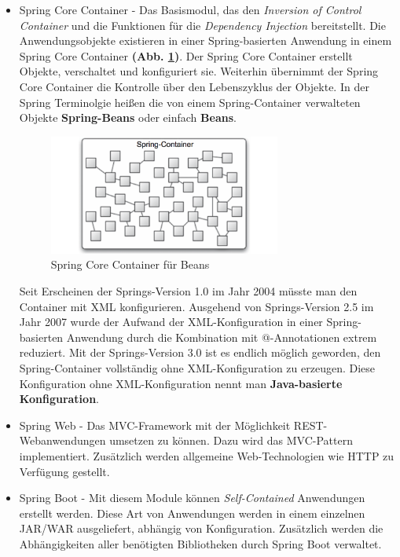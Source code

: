 \begin{itemize}
	\item Spring Core Container - Das Basismodul, das den \textit{Inversion of Control Container} \cite{InAndOutOfControl} und die Funktionen für die \textit{Dependency Injection} \cite{DIinSpring} bereitstellt. Die Anwendungsobjekte existieren in einer Spring-basierten Anwendung in einem Spring Core Container \textbf{(Abb. \ref{img:container})}. Der Spring Core Container erstellt Objekte, verschaltet und konfiguriert sie. Weiterhin übernimmt der Spring Core Container die Kontrolle über den Lebenszyklus der Objekte. In der Spring Terminolgie heißen die von einem Spring-Container verwalteten Objekte \textbf{Spring-Beans} oder einfach \textbf{Beans}.

\begin{figure}[H]
\centering
\includegraphics[width=3.0in]{resources/container}
\caption[Spring Core Container für Beans]{Spring Core Container für Beans}
\label{img:container}
\end{figure}

Seit Erscheinen der Springs-Version 1.0 im Jahr 2004 müsste man den Container mit XML konfigurieren. Ausgehend von Springs-Version 2.5 im Jahr 2007 wurde der Aufwand der XML-Konfiguration in einer Spring-basierten Anwendung durch die Kombination mit @-Annotationen extrem reduziert. Mit der Springs-Version 3.0 ist es endlich möglich geworden, den Spring-Container vollständig ohne XML-Konfiguration zu erzeugen. Diese Konfiguration ohne XML-Konfiguration nennt man \textbf{Java-basierte Konfiguration}.

	\item Spring Web - Das MVC-Framework mit der Möglichkeit REST-Webanwendungen umsetzen zu können. Dazu wird das MVC-Pattern implementiert. Zusätzlich werden allgemeine Web-Technologien wie HTTP zu Verfügung gestellt.
	\item Spring Boot - Mit diesem Module können \textit{Self-Contained} Anwendungen erstellt werden. Diese Art von Anwendungen werden in einem einzelnen JAR/WAR ausgeliefert, abhängig von Konfiguration. Zusätzlich werden die Abhängigkeiten aller benötigten Bibliotheken durch Spring Boot verwaltet. \cite{spring}
	\end{itemize}

